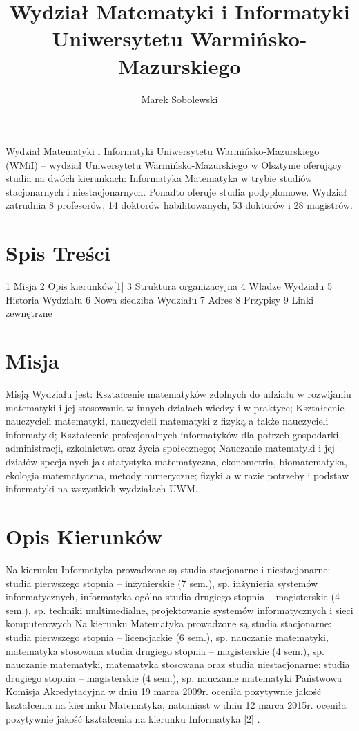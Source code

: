 \documentclass[a4paper,12pt]{article}
\title{Wydział Matematyki i Informatyki Uniwersytetu
Warmińsko-Mazurskiego}
\author{Marek Sobolewski}
\begin{document}
\maketitle

\section{}\label{sec:}
Wydział Matematyki i Informatyki Uniwersytetu Warmińsko-Mazurskiego (WMiI) – wydział
Uniwersytetu Warmińsko-Mazurskiego w Olsztynie oferujący studia na dwóch kierunkach:
Informatyka
Matematyka
w trybie studiów stacjonarnych i niestacjonarnych. Ponadto oferuje studia podyplomowe.
Wydział zatrudnia 8 profesorów, 14 doktorów habilitowanych, 53 doktorów i 28 magistrów.
\section{Spis Treści}\label{sec:}
1 Misja
2 Opis kierunków[1]
3 Struktura organizacyjna
4 Władze Wydziału
5 Historia Wydziału
6 Nowa siedziba Wydziału
7 Adres
8 Przypisy
9 Linki zewnętrzne
\section{Misja}\label{sec:}
Misją Wydziału jest:
Kształcenie matematyków zdolnych do udziału w rozwijaniu matematyki i jej stosowania w innych
działach wiedzy i w praktyce;
Kształcenie nauczycieli matematyki, nauczycieli matematyki z fizyką a także nauczycieli informatyki;
Kształcenie profesjonalnych informatyków dla potrzeb gospodarki, administracji, szkolnictwa oraz życia
społecznego;
Nauczanie matematyki i jej działów specjalnych jak statystyka matematyczna, ekonometria,
biomatematyka, ekologia matematyczna, metody numeryczne; fizyki a w razie potrzeby i podstaw
informatyki na wszystkich wydziałach UWM.
\section{Opis Kierunków}\label{sec:}
Na kierunku Informatyka prowadzone są studia stacjonarne i niestacjonarne:
studia pierwszego stopnia – inżynierskie (7 sem.), sp. inżynieria systemów informatycznych, informatyka
ogólna
studia drugiego stopnia – magisterskie (4 sem.), sp. techniki multimedialne, projektowanie systemów
informatycznych i sieci komputerowych
Na kierunku Matematyka prowadzone są studia stacjonarne:
studia pierwszego stopnia – licencjackie (6 sem.), sp. nauczanie matematyki, matematyka stosowana
studia drugiego stopnia – magisterskie (4 sem.), sp. nauczanie matematyki, matematyka stosowana
oraz studia niestacjonarne:
studia drugiego stopnia – magisterskie (4 sem.), sp. nauczanie matematyki
Państwowa Komisja Akredytacyjna w dniu 19 marca 2009r. oceniła pozytywnie jakość kształcenia na kierunku
Matematyka, natomiast w dniu 12 marca 2015r. oceniła pozytywnie jakość kształcenia na kierunku
Informatyka [2]
.
\end{document}
